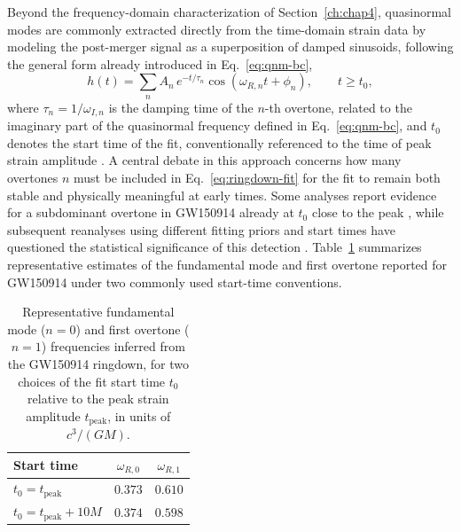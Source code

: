 
Beyond the frequency-domain characterization of Section~\ref{ch:chap4}, quasinormal modes are commonly extracted directly from the time-domain strain data by modeling the post-merger signal as a superposition of damped sinusoids, following the general form already introduced in Eq.~\eqref{eq:qnm-bc},
\begin{equation}
	h(t) = \sum_{n} A_n \, e^{-t/\tau_n} \cos(\omega_{R,n} t + \phi_n), \qquad t \geq t_0,
	\label{eq:ringdown-fit}
\end{equation}
where $\tau_n = 1/\omega_{I,n}$ is the damping time of the $n$-th overtone, related to the imaginary part of the quasinormal frequency defined in Eq.~\eqref{eq:qnm-bc}, and $t_0$ denotes the start time of the fit, conventionally referenced to the time of peak strain amplitude \cite{isi2019}.
A central debate in this approach concerns how many overtones $n$ must be included in Eq.~\eqref{eq:ringdown-fit} for the fit to remain both stable and physically meaningful at early times. Some analyses report evidence for a subdominant overtone in GW150914 already at $t_0$ close to the peak \cite{isi2019}, while subsequent reanalyses using different fitting priors and start times have questioned the statistical significance of this detection \cite{cotesta2022}. Table~\ref{tab:overtone} summarizes representative estimates of the fundamental mode and first overtone reported for GW150914 under two commonly used start-time conventions.

\begin{table}[H]
	\centering
	\caption{Representative fundamental mode ($n=0$) and first overtone ($n=1$) frequencies inferred from the GW150914 ringdown, for two choices of the fit start time $t_0$ relative to the peak strain amplitude $t_{\mathrm{peak}}$, in units of $c^3/(GM)$.}
	\label{tab:overtone}
	\begin{tabular}{lcc}
		\hline
		\textbf{Start time} & \textbf{$\omega_{R,0}$} & \textbf{$\omega_{R,1}$} \\
		\hline
		$t_0 = t_{\mathrm{peak}}$ \cite{isi2019} & $0.373$ & $0.610$ \\
		$t_0 = t_{\mathrm{peak}} + 10M$ \cite{cotesta2022} & $0.374$ & $0.598$ \\
		\hline
	\end{tabular}
\end{table}

